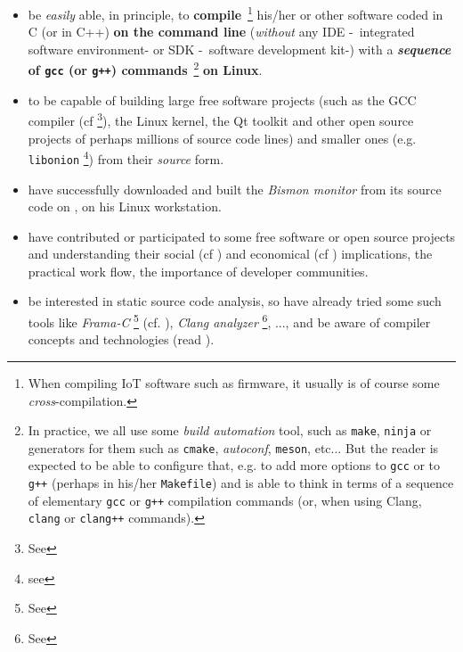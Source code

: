 \begin{itemize}
    \item be \emph{easily} able, in principle, to
      \textbf{compile}~\footnote{When compiling IoT software such as
        firmware, it usually is of course some
        \emph{cross}-compilation.}  his/her or other software coded in
      C (or in C++) \textbf{on the command line} (\emph{without} any
      IDE
      -~integrated software
      environment- or  SDK
      -~software development kit-)
      with a \textbf{\emph{sequence} of \texttt{gcc} (or \texttt{g++})
        commands}~\footnote{In practice, we all use some \emph{build
          automation} tool, such as \texttt{make}, \texttt{ninja} or
        generators for them such as \texttt{cmake}, \emph{autoconf},
        \texttt{meson}, etc... But the reader is expected to be able
        to configure that, e.g. to add more options to \texttt{gcc} or
        to \texttt{g++} (perhaps in his/her \texttt{Makefile}) and is
        able to think in terms of a sequence of elementary
        \texttt{gcc} or \texttt{g++} compilation commands (or, when
        using Clang, \texttt{clang} or \texttt{clang++} commands).}
      \textbf{on Linux}.



\item to be capable of building large free software projects (such as
  the GCC compiler (cf \cite{gcc-internals} \footnote{See
    }), the Linux kernel, the Qt toolkit and
  other open source projects of perhaps millions of source code lines)
  and smaller ones (e.g. \texttt{libonion} \footnote{see
    }) from their \emph{source}
  form.

\item have successfully downloaded and built the \emph{Bismon
  monitor}  from its source code on
  , on his Linux workstation.
  
\item have contributed or participated to some free software or open
  source projects and understanding their social (cf
  \cite{Raymond:2001:CathBaz}) and economical (cf
  \cite{Weber:2004:SuccessOpenSource, Tirole:2016:EcoBienCommun,
    Nagle:2018:Contributing}) implications, the practical work flow,
  the importance of developer communities.
  
\item be interested in static source code analysis, so have already
  tried some such tools like \emph{Frama-C} \footnote{See
    } (cf. \cite{Cuoq:2012:Frama-C}),
  \emph{Clang analyzer} \footnote{See
    }, ..., and be aware of
   compiler concepts and technologies (read
  \cite{Aho:2006:DragonBook}).


\end{itemize}
